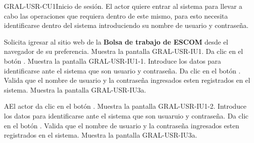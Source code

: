 
\begin{UseCase}[]{GRAL-USR-CU1}{Inicio de sesión.}{
	El actor quiere entrar al sistema para llevar a cabo las operaciones que requiera dentro de este mismo, para esto necesita 
	identificarse dentro del sistema introduciendo su nombre de usuario y contraseña.  
}
\end{UseCase}

\begin{UCtrayectoria}
	\UCpaso [\UCactor] Solicita igresar al sitio web de la \textbf{Bolsa de trabajo de ESCOM} desde el navegador de su preferencia.
    \UCpaso [\UCsist] Muestra la pantalla GRAL-USR-IU1.
	\UCpaso [\UCactor] Da clic en el botón . 
	\UCpaso [\UCsist] Muestra la pantalla GRAL-USR-IU1-1.
	\UCpaso [\UCactor] Introduce los datos para identificarse ante el sistema que son usuario y contraseña.\label{cu3-dd} 
	\UCpaso [\UCactor] Da clic en el botón . 
    \UCpaso [\UCsist] Valida que el nombre de usuario y la contraseña ingresados esten registrados en el sistema. 
    \UCpaso [\UCsist] Muestra la pantalla GRAL-USR-IU3a.
\end{UCtrayectoria}

\begin{UCtrayectoriaA}{A}{El actor da clic en el botón .}
	\UCpaso [\UCsist] Muestra la pantalla GRAL-USR-IU1-2.
	\UCpaso [\UCactor] Introduce los datos para identificarse ante el sistema que son usuaruio y contraseña.\label{cu3-dd} 
	\UCpaso [\UCactor] Da clic en el botón . 
    \UCpaso [\UCsist] Valida que el nombre de usuario y la contraseña ingresados esten registrados en el sistema. 
    \UCpaso [\UCsist] Muestra la pantalla GRAL-USR-IU3a.
\end{UCtrayectoriaA} 